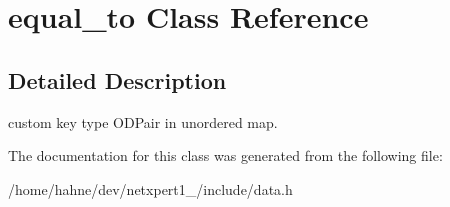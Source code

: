 \hypertarget{classequal__to}{}\section{equal\+\_\+to Class Reference}
\label{classequal__to}


\subsection{Detailed Description}
custom key type O\+D\+Pair in unordered map. 

The documentation for this class was generated from the following file\+:\begin{DoxyCompactItemize}
\item 
/home/hahne/dev/netxpert1\+\_/include/data.\+h\end{DoxyCompactItemize}
